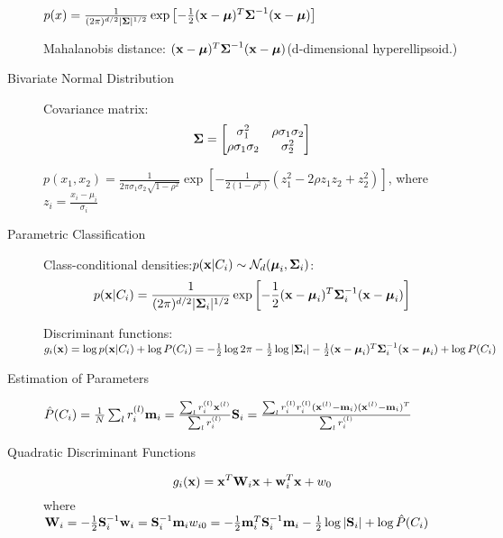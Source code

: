 \begin{description}
        $p(x) = \frac{1}{(2\pi)^{d/2}|\boldsymbol\Sigma|^{1/2}}\exp\left[
        -\frac{1}{2}(\mathbf{x}-\boldsymbol\mu)^T\boldsymbol\Sigma^{-1}(\mathbf{x}-\boldsymbol\mu) \right]$

        Mahalanobis distance: $(\mathbf{x} - \boldsymbol\mu)^T\boldsymbol\Sigma^{-1}(\mathbf{x}-\boldsymbol\mu)$(d-dimensional
        hyperellipsoid.)
    \item[Bivariate Normal Distribution] Covariance matrix:
        \[\boldsymbol\Sigma = \begin{bmatrix}
                \sigma_1^2 & \rho\sigma_1\sigma_2 \\
                \rho\sigma_1\sigma_2 & \sigma_2^2 \end{bmatrix}
        \]

         $p(x_1, x_2) =
        \frac{1}{2\pi\sigma_1\sigma_2\sqrt{1-\rho^2}}\exp\left[
        -\frac{1}{2(1-\rho^2)}(z_1^2 - 2\rho z_1 z_2 + z^2_2)  \right]$, where
        $z_i  = \frac{x_i - \mu_i}{\sigma_i}$
    \item[Parametric Classification] Class-conditional densities:$p(\mathbf{x}|C_i) \sim \mathcal{N}_d(\boldsymbol\mu_i, \boldsymbol\Sigma_i)$:
        \[p(\mathbf{x}|C_i) = \frac{1}{(2\pi)^{d/2}|\boldsymbol\Sigma_i|^{1/2}}\exp\left[
            -\frac{1}{2}(\mathbf{x} - \boldsymbol\mu_i)^T\boldsymbol\Sigma_i^{-1}(\mathbf{x} - \boldsymbol\mu_i)
        \right] \]

        Discriminant functions:
        $g_i(\mathbf{x})  = \log p(\mathbf{x}|C_i) + \log P(C_i)\\
                  = -\frac{1}{2}\log 2\pi - \frac{1}{2}\log|\boldsymbol\Sigma_i| -
                 \frac{1}{2}(\mathbf{x} - \boldsymbol\mu_i)^T\boldsymbol\Sigma^{-1}_i(\mathbf{x} - \boldsymbol\mu_i) +
                 \log P(C_i)$
    \item[Estimation of Parameters] 
     $       \hat{P}(C_i)  = \frac{1}{N}\sum_l r_i^{(l)}\\
            \mathbf{m}_i = \frac{\sum_l r_i^{(l)}\mathbf{x}^{(l)}}{\sum_l r_i^{(l)}} \\
            \mathbf{S}_i = \frac{\sum_l r_i^{(l)}r_i^{(l)}(\mathbf{x}^{(l)} -
            \mathbf{m}_i)(\mathbf{x}^{(l)}-\mathbf{m}_i)^T}{\sum_l r^{(l)}_i}$
    \item[Quadratic Discriminant Functions] 
        \[g_i(\mathbf{x}) = \mathbf{x}^T\mathbf{W}_i \mathbf{x} + \mathbf{w}_i^T\mathbf{x} + w_0\]
        where
            $\mathbf{W}_i = -\frac{1}{2}\mathbf{S}^{-1}_i \\
            \mathbf{w}_i  = \mathbf{S}_i^{-1}\mathbf{m}_i \\
            w_{i0} = -\frac{1}{2}\mathbf{m}_i^T\mathbf{S}_i^{-1}\mathbf{m}_i -
            \frac{1}{2}\log|\mathbf{S}_i| + \log \hat{P}(C_i)$
\end{description}

